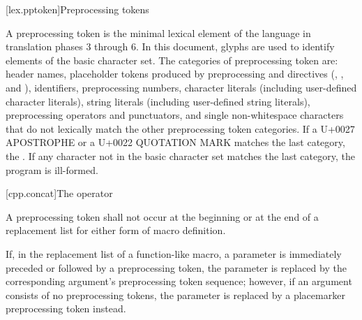 \documentclass{wg21}
\begin{document}
[lex.pptoken]{Preprocessing tokens}

A preprocessing token is the minimal lexical element of the language in translation
phases 3 through 6.
In this document,
glyphs are used to identify
elements of the basic character set.
The categories of preprocessing token are: header names,
placeholder tokens produced by preprocessing  and  directives
(, , and ),
identifiers, preprocessing numbers, character literals (including user-defined character
literals), string literals (including user-defined string literals), preprocessing
operators and punctuators, and single non-whitespace characters that do not lexically
match the other preprocessing token categories.
If a U+0027 APOSTROPHE or a U+0022 QUOTATION MARK
matches the last category, the .
If any character not in the basic character set matches the last category,
the program is ill-formed.

[cpp.concat]{The \tcode{\#\#} operator}%
%

A
\tcode{\#\#}
preprocessing token shall not occur at the beginning or
at the end of a replacement list for either form
of macro definition.

If, in the replacement list of a function-like macro, a parameter is
immediately preceded or followed by a
\tcode{\#\#}
preprocessing token, the parameter is replaced by the
corresponding argument's preprocessing token sequence; however, if an argument consists of no preprocessing tokens, the parameter is
replaced by a placemarker preprocessing token instead.
\end{document}
